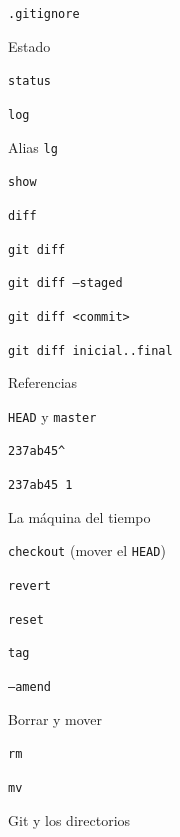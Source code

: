 \begin{longenum}
\begin{longenum}
\begin{longenum}
            \item \texttt{.gitignore}
        \end{longenum}
        \item Estado
        \begin{longenum}
            \item \texttt{status}
            \item \texttt{log}
            \item Alias \texttt{lg}
            \item \texttt{show}
            \item \texttt{diff}
            \begin{longenum}
                \item \texttt{git diff}
                \item \texttt{git diff --staged}
                \item \texttt{git diff <commit>}
                \item \texttt{git diff inicial..final}
            \end{longenum}
            \item Referencias
            \begin{longenum}
                \item \texttt{HEAD} y \texttt{master}
                \item \texttt{237ab45\^}
                \item \texttt{237ab45~1}
            \end{longenum}
        \end{longenum}
        \item La máquina del tiempo
        \begin{longenum}
            \item \texttt{checkout} (mover el \texttt{HEAD})
            \item \texttt{revert}
            \item \texttt{reset}
            \item \texttt{tag}
            \item \texttt{--amend}
        \end{longenum}
        \item Borrar y mover
        \begin{longenum}
            \item \texttt{rm}
            \item \texttt{mv}
        \end{longenum}
        \item Git y los directorios

\end{longenum}
\end{longenum}
